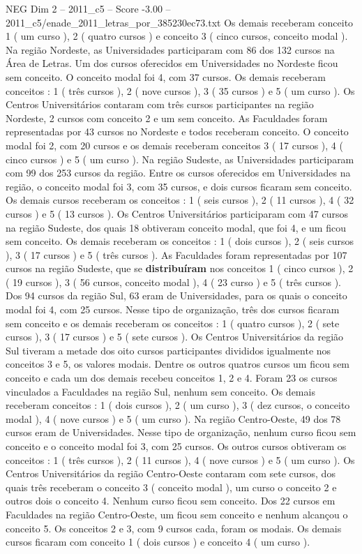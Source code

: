 \begin{textsample}{NEG Dim 2 – 2011\_c5 – Score -3.00 – 2011\_c5/enade\_2011\_letras\_por\_385230ec73.txt}
Os demais receberam conceito 1 ( um curso ), 2 ( quatro cursos ) e conceito 3 ( cinco cursos, conceito modal ).
Na região Nordeste, as Universidades participaram com 86 dos 132 cursos na Área de Letras.
Um dos cursos oferecidos em Universidades no Nordeste ficou sem conceito.
O conceito modal foi 4, com 37 cursos.
Os demais receberam conceitos : 1 ( três cursos ), 2 ( nove cursos ), 3 ( 35 cursos ) e 5 ( um curso ).
Os Centros Universitários contaram com três cursos participantes na região Nordeste, 2 cursos com conceito 2 e um sem conceito.
As Faculdades foram representadas por 43 cursos no Nordeste e todos receberam conceito.
O conceito modal foi 2, com 20 cursos e os demais receberam conceitos 3 ( 17 cursos ), 4 ( cinco cursos ) e 5 ( um curso ).
Na região Sudeste, as Universidades participaram com 99 dos 253 cursos da região.
Entre os cursos oferecidos em Universidades na região, o conceito modal foi 3, com 35 cursos, e dois cursos ficaram sem conceito.
Os demais cursos receberam os conceitos : 1 ( seis cursos ), 2 ( 11 cursos ), 4 ( 32 cursos ) e 5 ( 13 cursos ).
Os Centros Universitários participaram com 47 cursos na região Sudeste, dos quais 18 obtiveram conceito modal, que foi 4, e um ficou sem conceito.
Os demais receberam os conceitos : 1 ( dois cursos ), 2 ( seis cursos ), 3 ( 17 cursos ) e 5 ( três cursos ).
As Faculdades foram representadas por 107 cursos na região Sudeste, que se \textbf{distribuíram} nos conceitos 1 ( cinco cursos ), 2 ( 19 cursos ), 3 ( 56 cursos, conceito modal ), 4 ( 23 curso ) e 5 ( três cursos ).
Dos 94 cursos da região Sul, 63 eram de Universidades, para os quais o conceito modal foi 4, com 25 cursos.
Nesse tipo de organização, três dos cursos ficaram sem conceito e os demais receberam os conceitos : 1 ( quatro cursos ), 2 ( sete cursos ), 3 ( 17 cursos ) e 5 ( sete cursos ).
Os Centros Universitários da região Sul tiveram a metade dos oito cursos participantes divididos igualmente nos conceitos 3 e 5, os valores modais.
Dentre os outros quatros cursos um ficou sem conceito e cada um dos demais recebeu conceitos 1, 2 e 4.
Foram 23 os cursos vinculados a Faculdades na região Sul, nenhum sem conceito.
Os demais receberam conceitos : 1 ( dois cursos ), 2 ( um curso ), 3 ( dez cursos, o conceito modal ), 4 ( nove cursos ) e 5 ( um curso ).
Na região Centro-Oeste, 49 dos 78 cursos eram de Universidades.
Nesse tipo de organização, nenhum curso ficou sem conceito e o conceito modal foi 3, com 25 cursos.
Os outros cursos obtiveram os conceitos : 1 ( três cursos ), 2 ( 11 cursos ), 4 ( nove cursos ) e 5 ( um curso ).
Os Centros Universitários da região Centro-Oeste contaram com sete cursos, dos quais três receberam o conceito 3 ( conceito modal ), um curso o conceito 2 e outros dois o conceito 4.
Nenhum curso ficou sem conceito.
Dos 22 cursos em Faculdades na região Centro-Oeste, um ficou sem conceito e nenhum alcançou o conceito 5.
Os conceitos 2 e 3, com 9 cursos cada, foram os modais.
Os demais cursos ficaram com conceito 1 ( dois cursos ) e conceito 4 ( um curso ).

\end{textsample}
